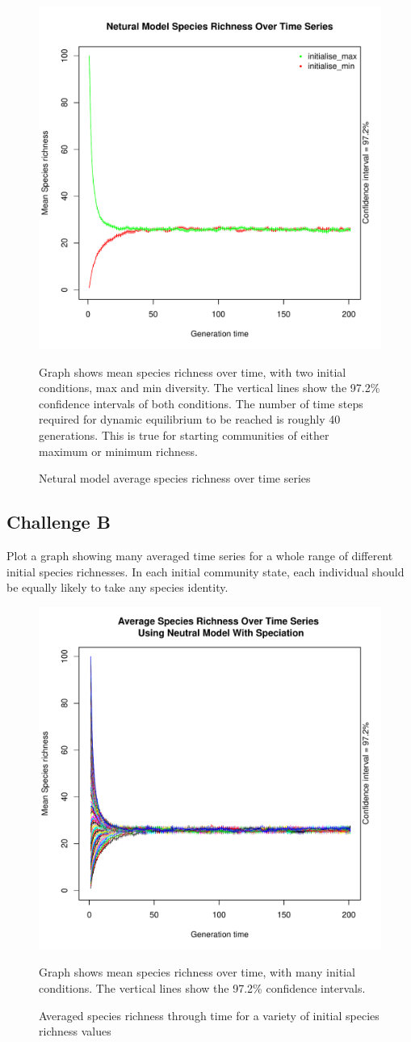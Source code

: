 \documentclass[12pt]{article}
\begin{document}
\begin{figure}[!ht]
\centering 
\includegraphics[width = 0.6\hsize]{../../results/ChallengeA.pdf} 
\caption{Netural model average species richness over time series}
Graph shows mean species richness over time, with two initial conditions, max and min diversity. The vertical lines show the 97.2\% confidence intervals of both conditions. The number of time steps required for dynamic equilibrium to be reached is roughly 40 generations. This is true for starting communities of either maximum or minimum richness.
\end{figure}




\subsection{Challenge B}
Plot a graph showing many averaged time series for a whole range of different initial species richnesses. In each initial community state, each individual should be equally likely to take any species identity.

\begin{figure}[!ht]
\centering 
\includegraphics[width = 0.6\hsize]{../../results/ChallengeB.pdf} 
\caption{Averaged species richness through time for
a variety of initial species richness values}
Graph shows mean species richness over time, with many initial conditions. The vertical lines show the 97.2\% confidence intervals. 
\end{figure}
\end{document}
